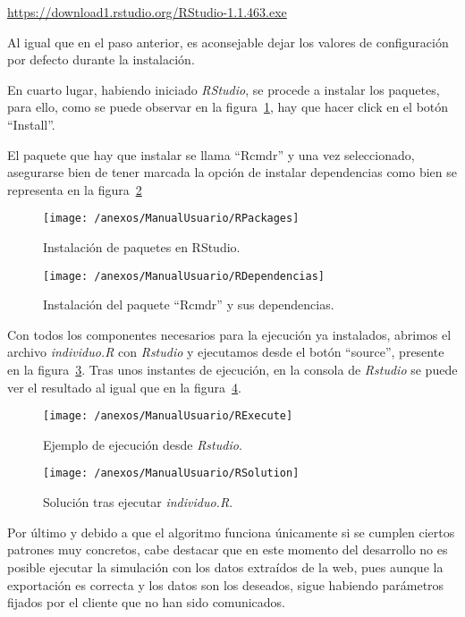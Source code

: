 \url{https://download1.rstudio.org/RStudio-1.1.463.exe}

Al igual que en el paso anterior, es aconsejable dejar los valores de configuración por defecto durante la instalación.

En cuarto lugar, habiendo iniciado \textit{RStudio}, se procede a instalar los paquetes, para ello, como se puede observar en la figura~\ref{img:RPackages}, hay que hacer click en el botón ``Install''.

El paquete que hay que instalar se llama ``Rcmdr'' y una vez seleccionado, asegurarse bien de tener marcada la opción de instalar dependencias como bien se representa en la figura~\ref{img:RDependencias}

\begin{figure}[h]
	\centering
	\texttt{[image: /anexos/ManualUsuario/RPackages]}
	\caption{Instalación de paquetes en RStudio.}	
	\label{img:RPackages}
\end{figure}

\begin{figure}[h]
	\centering
	\texttt{[image: /anexos/ManualUsuario/RDependencias]}
	\caption{Instalación del paquete ``Rcmdr'' y sus dependencias.}	
	\label{img:RDependencias}
\end{figure}

Con todos los componentes necesarios para la ejecución ya instalados, abrimos el archivo \textit{individuo.R} con \textit{Rstudio} y ejecutamos desde el botón ``source'', presente en la figura~\ref{img:RExecute}. Tras unos instantes de ejecución, en la consola de \textit{Rstudio} se puede ver el resultado al igual que en la figura~\ref{img:RSolution}.

\begin{figure}[h]
	\centering
	\texttt{[image: /anexos/ManualUsuario/RExecute]}
	\caption{Ejemplo de ejecución desde \textit{Rstudio}.}	
	\label{img:RExecute}
\end{figure}

\begin{figure}[h]
	\centering
	\texttt{[image: /anexos/ManualUsuario/RSolution]}
	\caption{Solución tras ejecutar \textit{individuo.R}.}	
	\label{img:RSolution}
\end{figure}

Por último y debido a que el algoritmo funciona únicamente si se cumplen ciertos patrones muy concretos, cabe destacar que en este momento del desarrollo no es posible ejecutar la simulación con los datos extraídos de la web, pues aunque la exportación es correcta y los datos son los deseados, sigue habiendo parámetros fijados por el cliente que no han sido comunicados. 

